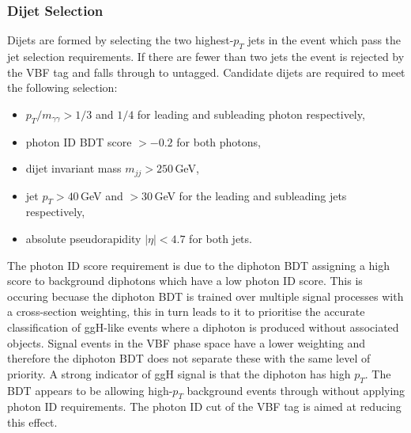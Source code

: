 \subsubsection{Dijet Selection}
Dijets are formed by selecting the two highest-$p_T$ jets in the event which pass the jet selection requirements. If there are fewer than two jets the event is rejected by the VBF tag and falls through to untagged. 
Candidate dijets are required to meet the following selection:
\begin{itemize}[leftmargin=.5in,noitemsep]
    \item $p_{T}/m_{\gamma\gamma} > 1/3$ and $1/4$ for leading and subleading photon respectively,
    \item photon ID BDT score $> -0.2$ for both photons,
    \item dijet invariant mass $m_{jj} > 250$\,GeV,
    \item jet $p_{T} > 40$\,GeV and $> 30$\,GeV for the leading and subleading jets respectively,
    \item absolute pseudorapidity $|\eta| < 4.7$ for both jets.
\end{itemize}

The photon ID score requirement is due to the diphoton BDT assigning a high score to background diphotons which have a low photon ID score.
This is occuring becuase the diphoton BDT is trained over multiple signal processes with a cross-section weighting, this in turn leads to it to prioritise the accurate classification of ggH-like events where a diphoton is produced without associated objects. 
Signal events in the VBF phase space have a lower weighting and therefore the diphoton BDT does not separate these with the same level of priority. 
A strong indicator of ggH signal is that the diphoton has high $p_T$. The BDT appears to be allowing high-$p_T$ background events through without applying photon ID requirements. The photon ID cut of the VBF tag is aimed at reducing this effect. 







